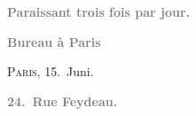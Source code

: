 \pstart
           \begin{otherlanguage}{french}\textcolor{gray}{\textbf{\textbf{Paraissant trois fois par jour.}}}\end{otherlanguage}\pend
           
\pstart
           \begin{otherlanguage}{french}\textcolor{gray}{\textbf{\textbf{Bureau à Paris}}}\end{otherlanguage}\hfill \textsc{Paris}, 15. Juni.\pend
           
\pstart
           \begin{otherlanguage}{french}\textcolor{gray}{\textbf{\textbf{24. Rue Feydeau.}}}\end{otherlanguage}\pend
           
